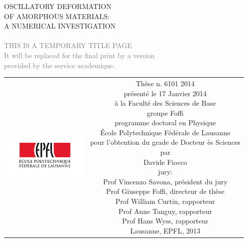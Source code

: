 \begin{titlepage}
\begin{center}
\sffamily


\null\vspace{2cm}
{\huge{OSCILLATORY DEFORMATION \\ OF AMORPHOUS MATERIALS: \\ A NUMERICAL INVESTIGATION \\ }}
\textcolor{gray}{\\ \small{THIS IS A TEMPORARY TITLE PAGE \\ It will be replaced for the final print by a version \\ provided by the service academique.}}
    
\vfill

\begin{tabular} {cc}
\parbox{0.3\textwidth}{\includegraphics[width=4cm]{images/epfl}}
&
\parbox{0.7\textwidth}{%
	Thèse n. 6101 2014\\
	présenté le 17 Janvier 2014\\
	à la Faculté des Sciences de Base\\
	groupe Foffi\\
	programme doctoral en Physique\\
%
	École Polytechnique Fédérale de Lausanne\\[6pt]
	pour l'obtention du grade de Docteur ès Sciences\\
	par\\ [4pt]
	\null \hspace{3em} Davide Fiocco\\[9pt]
%
\small
jury:\\[4pt]
%
    Prof Vincenzo Savona, président du jury\\
    Prof Giuseppe Foffi, directeur de thèse\\
    Prof William Curtin, rapporteur\\
    Prof Anne Tanguy, rapporteur\\
    Prof Hans Wyss, rapporteur\\[12pt]
%
Lausanne, EPFL, 2013}
\end{tabular}
\end{center}
\vspace{2cm}
\end{titlepage}



